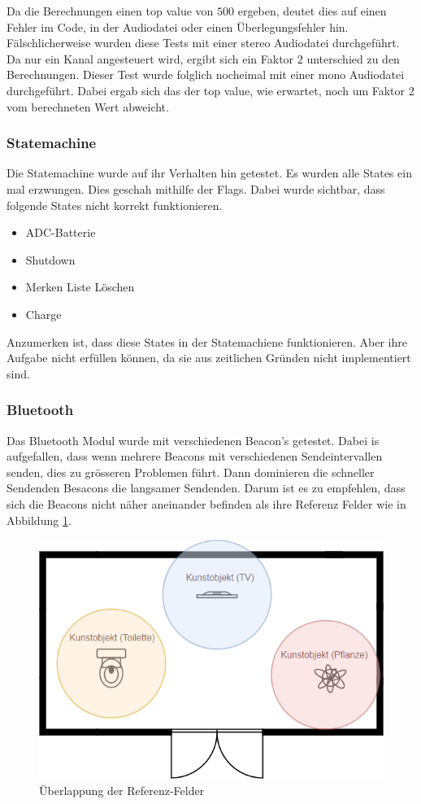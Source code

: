 Da die Berechnungen einen top value von $500$ ergeben, deutet dies auf einen Fehler im Code, in der Audiodatei oder einen Überlegungsfehler hin. Fälschlicherweise wurden diese Tests mit einer stereo Audiodatei durchgeführt. Da nur ein Kanal angesteuert wird, ergibt sich ein Faktor $2$ unterschied zu den Berechnungen. Dieser Test wurde folglich nocheimal mit einer mono Audiodatei durchgeführt. Dabei ergab sich das der top value, wie erwartet, noch um Faktor $2$ vom berechneten Wert abweicht.

\subsubsection{Statemachine}
Die Statemachine wurde auf ihr Verhalten hin getestet. Es wurden alle States ein mal erzwungen. Dies geschah mithilfe der Flags. Dabei wurde sichtbar, dass folgende States nicht korrekt funktionieren.

\begin{itemize}
	\item ADC-Batterie 
	\item Shutdown
	\item Merken Liste Löschen
	\item Charge
\end{itemize}

Anzumerken ist, dass diese States in der Statemachiene funktionieren.  Aber ihre Aufgabe nicht erfüllen können, da sie aus zeitlichen Gründen nicht implementiert sind.

\subsubsection{Bluetooth}
Das Bluetooth Modul wurde mit verschiedenen Beacon's getestet. Dabei is aufgefallen, dass wenn mehrere Beacons mit verschiedenen Sendeintervallen senden, dies zu grösseren Problemen führt. Dann dominieren die schneller Sendenden Besacons die langsamer Sendenden. Darum ist es zu empfehlen, dass sich die Beacons nicht näher aneinander befinden als ihre Referenz Felder wie in Abbildung \ref{fig:ref_felder}.

\begin{figure}[ht!]
	\center
	\includegraphics[scale=0.5]{data/validierung_software_ref_felder.png}
	\caption{Überlappung der Referenz-Felder}
	\label{fig:ref_felder}
\end{figure}

